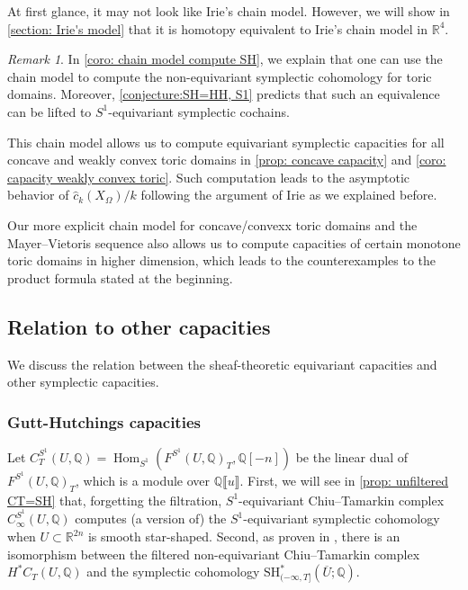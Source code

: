 \documentclass[11pt]{amsart}
\numberwithin{equation}{section}
\theoremstyle{plain}
\theoremstyle{definition}
\theoremstyle{remark}
\newtheorem{RMK}[rmk]{Remark}
\newcommand{\bQ} { {\mathbb{Q}}}
\newcommand{\bR} { {\mathbb{R}}}
\newcommand{\fpw}[1]{{\llbracket #1\rrbracket}}
\newcommand\Hom{\operatorname{Hom}}
\begin{document}
At first glance, it may not look like Irie's chain model. However, we will show in \autoref{section: Irie's model} that it is homotopy equivalent to Irie's chain model in $\bR^4$.

\begin{RMK}In \autoref{coro: chain model compute SH}, we explain that one can use the chain model to compute the non-equivariant symplectic cohomology for toric domains. Moreover, \autoref{conjecture:SH=HH, S1} predicts that such an equivalence can be lifted to $S^1$-equivariant symplectic cochains.    
\end{RMK}

This chain model allows us to compute equivariant symplectic capacities for all concave and weakly convex toric domains in \autoref{prop: concave capacity} and \autoref{coro: capacity weakly convex toric}. Such computation leads to the asymptotic behavior of $\widehat{c}_k(X_\Omega)/k$ following the argument of Irie as we explained before.

Our more explicit chain model for concave/convexx toric domains and the Mayer--Vietoris sequence also allows us to compute capacities of certain monotone toric domains in higher dimension, which leads to the counterexamples to the product formula stated at the beginning.








\subsection{Relation to other capacities}
We discuss the relation between the sheaf-theoretic equivariant capacities and other symplectic capacities.


\subsubsection{Gutt-Hutchings capacities} Let $C_T^{S^1}(U,\bQ)=\Hom_{S^1}(F^{S^1}(U,\bQ)_T,\bQ[-n])$ be the linear dual of $F^{S^1}(U,\bQ)_T$, which is a module over $\bQ\fpw{u}$. 
First, we will see in \autoref{prop: unfiltered CT=SH} that, forgetting the filtration, $S^1$-equivariant Chiu--Tamarkin complex $C_\infty^{S^1}(U,\bQ)$ computes (a version of) the $S^1$-equivariant symplectic cohomology when $U\subset \bR^{2n}$ is smooth star-shaped. Second, as proven in \cite{Hochschild-Kuo-Shende-Zhang}, there is an isomorphism between the filtered non-equivariant Chiu--Tamarkin complex $H^*C_T(U,\bQ)$ and the symplectic cohomology $\mathrm{SH}^{*}_{(-\infty,T]}(\overline{U}; \bQ)$.
\end{document}
